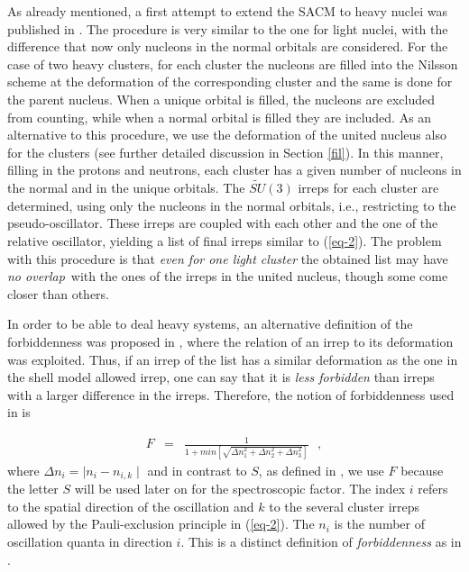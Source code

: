\documentclass[12pt]{article}
\newcommand{\beqa}{\begin{eqnarray}}
\newcommand{\eeqa}{\end{eqnarray}}
\begin{document}
As already mentioned, a first attempt to extend
the SACM to heavy nuclei was published 
in \cite{cseh-scheid,cseh-algora}.
The procedure is very similar to the one for light nuclei, 
with the difference that now only nucleons in
the normal orbitals are considered. 
For the case of two heavy clusters, for each cluster
the nucleons are filled into the Nilsson scheme
at the deformation of the corresponding cluster and the same is done for the  parent 
nucleus. When a unique orbital is filled, the
nucleons are excluded from counting, while when a normal orbital is filled they are included.
As an alternative to this procedure, we use the deformation of the united nucleus also for the clusters
(see further detailed discussion in Section \ref{fil}).
In this manner, filling in the protons and neutrons, 
each cluster has a given number of nucleons in the normal and
in the unique orbitals. The $\widetilde{SU}(3)$ irreps for each cluster are determined, using only the nucleons in the normal orbitals, i.e., restricting to the pseudo-oscillator. These irreps
are coupled with each other and the one of the relative oscillator, yielding a list of final irreps similar to (\ref{eq-2}). The problem with 
this procedure is that {\it even for one light cluster} the obtained list may have 
{\it no overlap}\ with the ones
of the irreps in the united nucleus, though some come closer than others. 

In order to be able to deal heavy systems, an alternative definition of the forbiddenness
was proposed in \cite{cseh-scheid,cseh-algora}, where the relation of an irrep to its deformation 
was exploited.
Thus, if an irrep of the list has a similar deformation as the one in the shell model allowed irrep, one can say that it is {\it less forbidden} than 
irreps with a larger difference in the irreps. Therefore, the notion of forbiddenness used 
in \cite{cseh-scheid,cseh-algora} is 

\beqa
F & = & \frac{1}{1+min\left[\sqrt{\Delta n_1^2+\Delta n_2^2+\Delta n_3^2}\right]}
~~~,
\label{eq-3}
\eeqa
where $\Delta n_i = \mid n_i - n_{i,k}\mid$
and in contrast to $S$, as defined in  
\cite{cseh-scheid,cseh-algora}, we use $F$ because the letter
$S$ will be used later on for the spectroscopic factor. 
The index $i$ refers to the 
spatial direction of the oscillation and $k$ to the  several cluster irreps allowed by  the Pauli-exclusion principle in (\ref{eq-2}). The $n_i$ is the
number of oscillation quanta in direction $i$. This is a distinct definition
of {\it forbiddenness} as in \cite{smirnov}.
\end{document}
